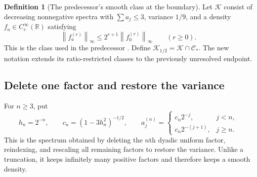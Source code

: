 \documentclass[11pt,a4paper]{article}
\numberwithin{equation}{section}
\theoremstyle{definition}
\newtheorem{definition}[theorem]{Definition}
\theoremstyle{remark}
\newcommand{\R}{\mathbb R}
\newcommand{\C}{\mathcal C}
\newcommand{\K}{\mathcal K}
\newcommand{\norm}[1]{\left\lVert #1\right\rVert}
\begin{document}
\begin{definition}[The predecessor's smooth class at the boundary]
\label{def:smooth}
Let $\K$ consist of decreasing nonnegative spectra with
$\sum a_j\le3$, variance $1/9$, and a density $f_a\in C_c^\infty(\R)$
satisfying
\begin{equation}
 \norm{f_a^{(r)}}_\infty
 \le 2^{r+1}\norm{f_0^{(r)}}_\infty\qquad(r\ge0).
 \label{eq:smooth-class}
\end{equation}
This is the class used in the predecessor \cite{anchored}. Define
$\K_{1/2}=\K\cap\C_*$. The new notation extends its ratio-restricted
classes to the previously unresolved endpoint.
\end{definition}

\subsection{Delete one factor and restore the variance}

For $n\ge3$, put
\begin{equation}
 h_n=2^{-n},\qquad c_n=(1-3h_n^2)^{-1/2},\qquad
 a_j^{(n)}=
 \begin{cases}
 c_n2^{-j},&j<n,\\
 c_n2^{-(j+1)},&j\ge n.
 \end{cases}
 \label{eq:deleted-witness}
\end{equation}
This is the spectrum obtained by deleting the $n$th dyadic uniform factor,
reindexing, and rescaling all remaining factors to restore the variance.
Unlike a truncation, it keeps infinitely many positive factors and therefore
keeps a smooth density.
\end{document}
